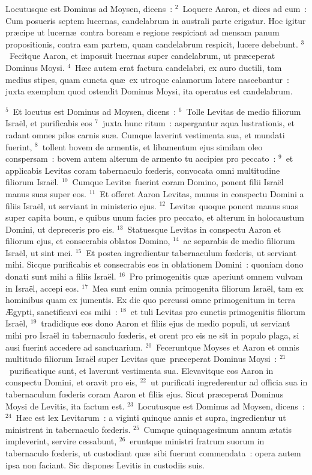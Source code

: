 \lettrine[lines=3,image=true,loversize=0.05,lraise=-0.03]{L}{}ocutusque est Dominus ad Moysen, dicens~:
${}^{2}$~Loquere Aaron, et dices ad eum~: Cum posueris septem lucernas, candelabrum in australi parte erigatur. Hoc igitur pr\ae cipe ut lucern\ae\ contra boream e regione respiciant ad mensam panum propositionis, contra eam partem, quam candelabrum respicit, lucere debebunt.
${}^{3}$~Fecitque Aaron, et imposuit lucernas super candelabrum, ut pr\ae ceperat Dominus Moysi.
${}^{4}$~H\ae c autem erat factura candelabri, ex auro ductili, tam medius stipes, quam cuncta qu\ae\ ex utroque calamorum latere nascebantur~: juxta exemplum quod ostendit Dominus Moysi, ita operatus est candelabrum.


${}^{5}$~Et locutus est Dominus ad Moysen, dicens~:
${}^{6}$~Tolle Levitas de medio filiorum Isra\"el, et purificabis eos
${}^{7}$~juxta hunc ritum~: aspergantur aqua lustrationis, et radant omnes pilos carnis su\ae . Cumque laverint vestimenta sua, et mundati fuerint,
${}^{8}$~tollent bovem de armentis, et libamentum ejus similam oleo conspersam~: bovem autem alterum de armento tu accipies pro peccato~:
${}^{9}$~et applicabis Levitas coram tabernaculo fœderis, convocata omni multitudine filiorum Isra\"el.
${}^{10}$~Cumque Levit\ae\ fuerint coram Domino, ponent filii Isra\"el manus suas super eos.
${}^{11}$~Et offeret Aaron Levitas, munus in conspectu Domini a filiis Isra\"el, ut serviant in ministerio ejus.
${}^{12}$~Levit\ae\ quoque ponent manus suas super capita boum, e quibus unum facies pro peccato, et alterum in holocaustum Domini, ut depreceris pro eis.
${}^{13}$~Statuesque Levitas in conspectu Aaron et filiorum ejus, et consecrabis oblatos Domino,
${}^{14}$~ac separabis de medio filiorum Isra\"el, ut sint mei.
${}^{15}$~Et postea ingredientur tabernaculum fœderis, ut serviant mihi. Sicque purificabis et consecrabis eos in oblationem Domini~: quoniam dono donati sunt mihi a filiis Isra\"el.
${}^{16}$~Pro primogenitis qu\ae\ aperiunt omnem vulvam in Isra\"el, accepi eos.
${}^{17}$~Mea sunt enim omnia primogenita filiorum Isra\"el, tam ex hominibus quam ex jumentis. Ex die quo percussi omne primogenitum in terra \AE gypti, sanctificavi eos mihi~:
${}^{18}$~et tuli Levitas pro cunctis primogenitis filiorum Isra\"el,
${}^{19}$~tradidique eos dono Aaron et filiis ejus de medio populi, ut serviant mihi pro Isra\"el in tabernaculo fœderis, et orent pro eis ne sit in populo plaga, si ausi fuerint accedere ad sanctuarium.
${}^{20}$~Feceruntque Moyses et Aaron et omnis multitudo filiorum Isra\"el super Levitas qu\ae\ pr\ae ceperat Dominus Moysi~:
${}^{21}$~purificatique sunt, et laverunt vestimenta sua. Elevavitque eos Aaron in conspectu Domini, et oravit pro eis,
${}^{22}$~ut purificati ingrederentur ad officia sua in tabernaculum fœderis coram Aaron et filiis ejus. Sicut pr\ae ceperat Dominus Moysi de Levitis, ita factum est.
${}^{23}$~Locutusque est Dominus ad Moysen, dicens~:
${}^{24}$~H\ae c est lex Levitarum~: a viginti quinque annis et supra, ingredientur ut ministrent in tabernaculo fœderis.
${}^{25}$~Cumque quinquagesimum annum \ae tatis impleverint, servire cessabunt,
${}^{26}$~eruntque ministri fratrum suorum in tabernaculo fœderis, ut custodiant qu\ae\ sibi fuerunt commendata~: opera autem ipsa non faciant. Sic dispones Levitis in custodiis suis.


